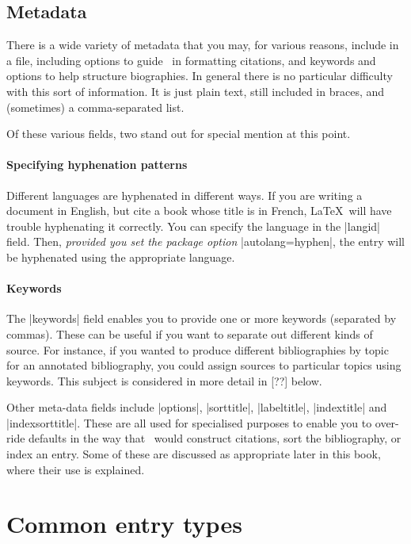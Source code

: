 {\subsection{Metadata}

There is a wide variety of metadata that you may, for various reasons,
include in a file, including options to guide \biblatex\ in formatting
citations, and keywords and options to help structure biographies. In
general there is no particular difficulty with this sort of
information. It is just plain text, still included in braces, and
(sometimes) a comma-separated list.

Of these various fields, two stand out for special mention at this
point.

\paragraph{Specifying hyphenation patterns}Different languages are hyphenated in
different ways. If you are writing a document in English, but cite a
book whose title is in French, \LaTeX\ will have trouble hyphenating
it correctly. You can specify the language in the |langid|
field. Then, \emph{provided you set the package option}
|autolang=hyphen|, the entry will be hyphenated using the appropriate
language.

\paragraph{Keywords} The |keywords| field enables you to provide one
or more keywords (separated by commas). These can be useful if you
want to separate out different kinds of source. For instance, if you
wanted to produce different bibliographies by topic for an annotated
bibliography, you could assign sources to particular topics using
keywords. This subject is considered in more detail in [??] below.

Other meta-data fields include |options|, |sorttitle|, |labeltitle|,
|indextitle| and |indexsorttitle|. These are all used for specialised
purposes to enable you to over-ride defaults in the way that
\biblatex\ would construct citations, sort the bibliography, or index
an entry. Some of these are discussed as appropriate later in this
book, where their use is explained.

\section{Common entry types}

}
